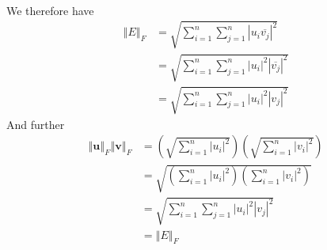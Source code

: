 \begin{enumerate}
\begin{solution}
\begin{align*}
\end{align*}
We therefore have \begin{align*}\left\Vert E \right\Vert_F&=\sqrt{\sum_{i=1}^n\sum_{j=1}^n|u_i\overline{v_j}|^2}\\&=\sqrt{\sum_{i=1}^n\sum_{j=1}^n|u_i|^2|\overline{v_j}|^2}\\&=\sqrt{\sum_{i=1}^n\sum_{j=1}^n|u_i|^2|v_j|^2}\end{align*} And further
\begin{align*}\left\Vert \mathbf{u} \right\Vert_F \left\Vert \mathbf{v} \right\Vert_F
    &= \left(\sqrt{\sum_{i=1}^n|u_i|^2}\right)\left(\sqrt{\sum_{i=1}^n|v_i|^2}\right)\\
    &= \sqrt{\left(\sum_{i=1}^n|u_i|^2\right)\left(\sum_{i=1}^n|v_i|^2\right)}\\
    &= \sqrt{\sum_{i=1}^n\sum_{j=1}^n|u_i|^2|v_j|^2}\\
    &= \left\Vert E \right\Vert_F
\end{align*}
\end{solution}
\end{enumerate}
